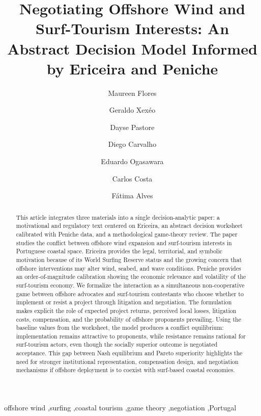 \documentclass[final,times,authoryear]{elsarticle}
\begin{document}
\begin{frontmatter}

\title{Negotiating Offshore Wind and Surf-Tourism Interests: An Abstract Decision Model Informed by Ericeira and Peniche}

\author[first]{Maureen Flores}
\author[sec]{Geraldo Xexéo}
\author[third]{Dayse Pastore}
\author[third]{Diego Carvalho}
\author[third]{Eduardo Ogasawara}
\author[fourth]{Carlos Costa}
\author[fourth]{Fátima Alves}


\begin{abstract}
This article integrates three materials into a single decision-analytic paper: a motivational and regulatory text centered on Ericeira, an abstract decision worksheet calibrated with Peniche data, and a methodological game-theory review. The paper studies the conflict between offshore wind expansion and surf-tourism interests in Portuguese coastal space. Ericeira provides the legal, territorial, and symbolic motivation because of its World Surfing Reserve status and the growing concern that offshore interventions may alter wind, seabed, and wave conditions. Peniche provides an order-of-magnitude calibration showing the economic relevance and volatility of the surf-tourism economy. We formalize the interaction as a simultaneous non-cooperative game between offshore advocates and surf-tourism contestants who choose whether to implement or resist a project through litigation and negotiation. The formulation makes explicit the role of expected project returns, perceived local losses, litigation costs, compensation, and the probability of offshore proponents prevailing. Using the baseline values from the worksheet, the model produces a conflict equilibrium: implementation remains attractive to proponents, while resistance remains rational for surf-tourism actors, even though the socially superior outcome is negotiated acceptance. This gap between Nash equilibrium and Pareto superiority highlights the need for stronger institutional representation, compensation design, and negotiation mechanisms if offshore deployment is to coexist with surf-based coastal economies.
\end{abstract}

\begin{keyword}
offshore wind \sep surfing \sep coastal tourism \sep game theory \sep negotiation \sep Portugal
\end{keyword}

\end{frontmatter}
\end{document}
